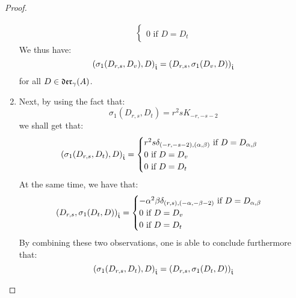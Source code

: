 \begin{proof}
\begin{enumerate}
$$\begin{aligned}
\begin{cases}
                                    \\
                                    \text{$0$ if $D = D_t$}
                                \end{cases}
                            \end{aligned}
                        $$
                    We thus have:
                        $$\left( \sigma_1(D_{r, s}, D_v), D \right)_{\hat{\mathfrak{t}}} = \left( D_{r, s}, \sigma_1(D_v, D) \right)_{\hat{\mathfrak{t}}}$$
                    for all $D \in \mathfrak{der}_{\gamma}(A)$.
                    \item Next, by using the fact that:
                        $$\sigma_1(D_{r, s}, D_t) = r^2 s K_{-r, -s - 2}$$
                    we shall get that:
                        $$
                            \left( \sigma_1(D_{r, s}, D_t), D \right)_{\hat{\mathfrak{t}}} =
                            \begin{cases}
                                \text{$r^2 s \delta_{(-r, -s - 2), (\alpha, \beta)}$ if $D = D_{\alpha, \beta}$}
                                \\
                                \text{$0$ if $D = D_v$}
                                \\
                                \text{$0$ if $D = D_t$}
                            \end{cases}
                        $$
                    At the same time, we have that:
                        $$
                            \begin{aligned}
                                \left( D_{r, s}, \sigma_1(D_t, D) \right)_{\hat{\mathfrak{t}}} =
                                \begin{cases}
                                    \text{$-\alpha^2 \beta \delta_{(r, s), (-\alpha, -\beta - 2)}$ if $D = D_{\alpha, \beta}$}
                                    \\
                                    \text{$0$ if $D = D_v$}
                                    \\
                                    \text{$0$ if $D = D_t$}
                                \end{cases}
                            \end{aligned}
                        $$
                    By combining these two observations, one is able to conclude furthermore that:
                        $$\left( \sigma_1(D_{r, s}, D_t), D \right)_{\hat{\mathfrak{t}}} = \left( D_{r, s}, \sigma_1(D_t, D) \right)_{\hat{\mathfrak{t}}}$$

\end{enumerate}
\end{proof}
